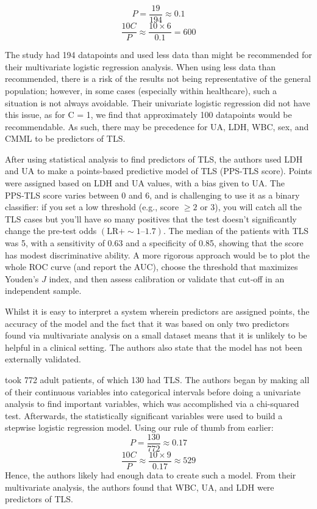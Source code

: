 \documentclass{article}
\begin{document}
\[P = \frac{19}{194} \approx 0.1 \]
\[\frac{10C}{P} \approx \frac{10 \times 6}{0.1} = 600\]

The study had 194 datapoints and used less data than might be recommended for their multivariate logistic regression analysis. When using less data than recommended, there is a risk of the results not being representative of the general population; however, in some cases (especially within healthcare), such a situation is not always avoidable. Their univariate logistic regression did not have this issue, as for C = 1, we find that approximately 100 datapoints would be recommendable. As such, there may be precedence for UA, LDH, WBC,  sex, and CMML to be predictors of TLS.

After using statistical analysis to find predictors of TLS, the authors used LDH and UA to make a points-based predictive model of TLS (PPS-TLS score). Points were assigned based on LDH and UA values, with a bias given to UA. The PPS‑TLS score varies between 0 and 6, and is challenging to use it as a binary classifier: if you set a low threshold (e.g., score \(\ge 2\) or 3), you will catch all the TLS cases but you’ll have so many positives that the test doesn’t significantly change the pre‑test odds \((\mathrm{LR}+ \sim1 \text{--}1.7)\). The median of the patients with TLS was 5, with a sensitivity of 0.63 and a specificity of 0.85, showing that the score has modest discriminative ability. 
A more rigorous approach would be to plot the whole ROC curve (and report the AUC), choose the threshold that maximizes Youden’s \(J\) index, and then assess calibration or validate that cut‑off in an independent sample.



Whilst it is easy to interpret a system wherein predictors are assigned points, the accuracy of the model and the fact that it was based on only two predictors found via multivariate analysis on a small dataset means that it is unlikely to be helpful in a clinical setting. The authors also state that the model has not been externally validated. 

\cite{montesinos2008tumor} took 772 adult patients, of which 130 had TLS. The authors began by making all of their continuous variables into categorical intervals before doing a univariate analysis to find important variables, which was accomplished via a chi-squared test. Afterwards, the statistically significant variables were used to build a stepwise logistic regression model. Using our rule of thumb from earlier:
\[P =\frac{130}{772} \approx 0.17 \]
\[ \frac{10C}{P} \approx \frac{10\times9}{0.17} \approx 529 \]
Hence, the authors likely had enough data to create such a model. From their multivariate analysis, the authors found that WBC, UA, and LDH were predictors of TLS.
\end{document}
